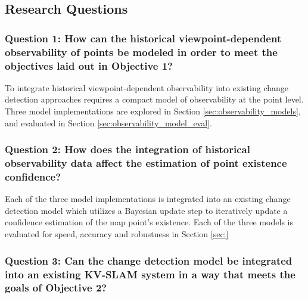 \subsection{Research Questions}

\subsubsection*{Question 1: How can the historical viewpoint-dependent observability of points be modeled in order to meet the objectives laid out in Objective 1?}

To integrate historical viewpoint-dependent observability into existing change detection approaches requires a compact model of observability at the point level. Three model implementations are explored in Section \ref{sec:observability_models}, and evaluated in Section \ref{sec:observability_model_eval}.

\subsubsection*{Question 2: How does the integration of historical observability data affect the estimation of point existence confidence?}

Each of the three model implementations is integrated into an existing change detection model which utilizes a Bayesian update step to iteratively update a confidence estimation of the map point's existence. Each of the three models is evaluated for speed, accuracy and robustness in Section \ref{sec:}

\subsubsection*{Question 3: Can the change detection model be integrated into an existing KV-SLAM system in a way that meets the goals of Objective 2?}